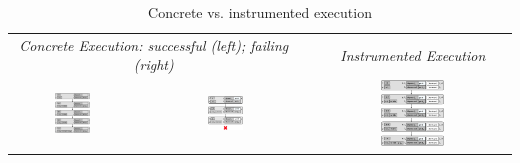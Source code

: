 \begin{table}[t!]
\centering 
{\scriptsize \begin{tabular}{@{}c@{}ccc@{}c@{}}\toprule
\multicolumn{3}{c}{{\it Concrete Execution: successful (left); failing (right)}} & &  \emph{Instrumented Execution}  \\
\cmidrule{1-3} \cmidrule{5-5}
{\includegraphics[width=0.30\textwidth,valign=T]{figures/conc_exec.png}} & & 
{\includegraphics[width=0.26\textwidth,valign=T]{figures/conc_wrong_exec.png}} & & 
{\includegraphics[width=0.342\textwidth,valign=T]{figures/inst_exec.png}}  \\  
\bottomrule
\end{tabular}}
\vspace{2pt}
\caption{Concrete vs. instrumented execution\label{example:symb:states:vs:assertions}}
\vspace*{-0.9cm}
\end{table}

